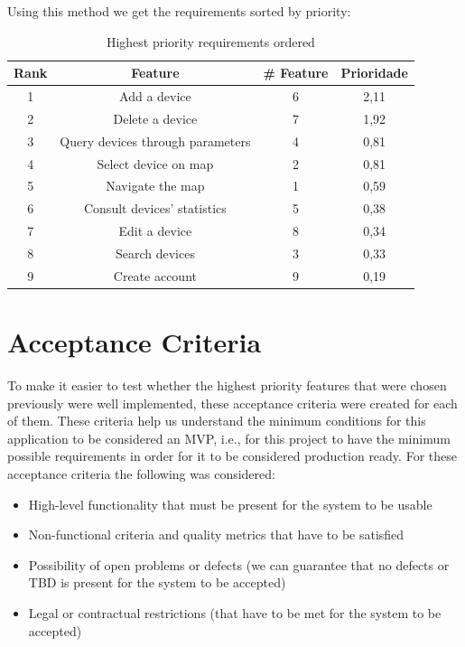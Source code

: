 \documentclass{scrreprt}
\begin{document}
Using this method we get the requirements sorted by priority:

\begin{table}[H]
    \centering
    \begin{tabular}{|c|c|c|c|}
        \hline
        \rowcolor{blue!20!white}
        \textbf{Rank} & \textbf{Feature} & \textbf{\# Feature} & \textbf{Prioridade} \\
        \hline
        1 & Add a device & 6 & 2,11 \\
        \hline
        2 & Delete a device & 7 & 1,92 \\
        \hline
        3 & Query devices through parameters & 4 & 0,81 \\
        \hline
        4 & Select device on map & 2 & 0,81 \\
        \hline
        5 & Navigate the map & 1 & 0,59 \\
        \hline
        6 & Consult devices' statistics & 5 & 0,38 \\
        \hline
        7 & Edit a device & 8 & 0,34 \\
        \hline
        8 & Search devices & 3 & 0,33 \\
        \hline
        9 & Create account & 9 & 0,19 \\
        \hline
    \end{tabular}
    \caption{Highest priority requirements ordered}
    \label{table:requisitos ordenados}
\end{table}

\section{Acceptance Criteria}

To make it easier to test whether the highest priority features that were chosen
previously were well implemented, these acceptance criteria were created for each
of them. These criteria help us understand the minimum conditions for this
application to be considered an MVP, i.e., for this project to have the minimum
possible requirements in order for it to be considered production ready.
\newline
For these acceptance criteria the following was considered:

\begin{itemize}
    \item High-level functionality that must be present for the system to be usable
    \item Non-functional criteria and quality metrics that have to be satisfied
    \item Possibility of open problems or defects (we can guarantee that no defects or TBD is present for the system to be accepted)
    \item Legal or contractual restrictions (that have to be met for the system to be accepted)
\end{itemize}
\end{document}
